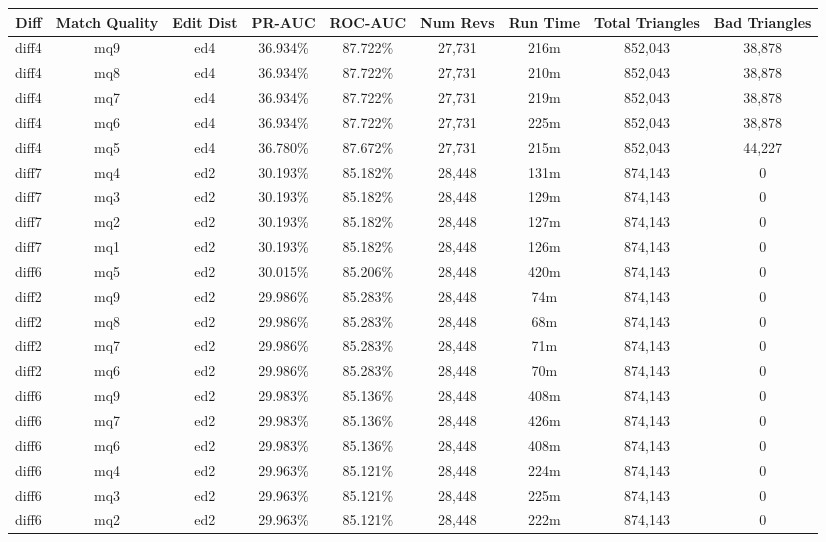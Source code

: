 \begin{sidewaystable}[!ph]
  \begin{center}
    \begin{tabular}{|c|c|c||c|c||c|c|c|c|}
\hline
Diff & Match Quality & Edit Dist
        & PR-AUC & ROC-AUC
        & Num Revs & Run Time
        & Total Triangles & Bad Triangles \\
\hline
\hline
diff4 & mq9 & ed4 & 36.934\% & 87.722\% & 27,731 & 216m & 852,043 & 38,878 \\
diff4 & mq8 & ed4 & 36.934\% & 87.722\% & 27,731 & 210m & 852,043 & 38,878 \\
diff4 & mq7 & ed4 & 36.934\% & 87.722\% & 27,731 & 219m & 852,043 & 38,878 \\
diff4 & mq6 & ed4 & 36.934\% & 87.722\% & 27,731 & 225m & 852,043 & 38,878 \\
diff4 & mq5 & ed4 & 36.780\% & 87.672\% & 27,731 & 215m & 852,043 & 44,227 \\
diff7 & mq4 & ed2 & 30.193\% & 85.182\% & 28,448 & 131m & 874,143 & 0 \\
diff7 & mq3 & ed2 & 30.193\% & 85.182\% & 28,448 & 129m & 874,143 & 0 \\
diff7 & mq2 & ed2 & 30.193\% & 85.182\% & 28,448 & 127m & 874,143 & 0 \\
diff7 & mq1 & ed2 & 30.193\% & 85.182\% & 28,448 & 126m & 874,143 & 0 \\
diff6 & mq5 & ed2 & 30.015\% & 85.206\% & 28,448 & 420m & 874,143 & 0 \\
diff2 & mq9 & ed2 & 29.986\% & 85.283\% & 28,448 & 74m & 874,143 & 0 \\
diff2 & mq8 & ed2 & 29.986\% & 85.283\% & 28,448 & 68m & 874,143 & 0 \\
diff2 & mq7 & ed2 & 29.986\% & 85.283\% & 28,448 & 71m & 874,143 & 0 \\
diff2 & mq6 & ed2 & 29.986\% & 85.283\% & 28,448 & 70m & 874,143 & 0 \\
diff6 & mq9 & ed2 & 29.983\% & 85.136\% & 28,448 & 408m & 874,143 & 0 \\
diff6 & mq7 & ed2 & 29.983\% & 85.136\% & 28,448 & 426m & 874,143 & 0 \\
diff6 & mq6 & ed2 & 29.983\% & 85.136\% & 28,448 & 408m & 874,143 & 0 \\
diff6 & mq4 & ed2 & 29.963\% & 85.121\% & 28,448 & 224m & 874,143 & 0 \\
diff6 & mq3 & ed2 & 29.963\% & 85.121\% & 28,448 & 225m & 874,143 & 0 \\
diff6 & mq2 & ed2 & 29.963\% & 85.121\% & 28,448 & 222m & 874,143 & 0 \\

\end{tabular}
\end{center}
\end{sidewaystable}
